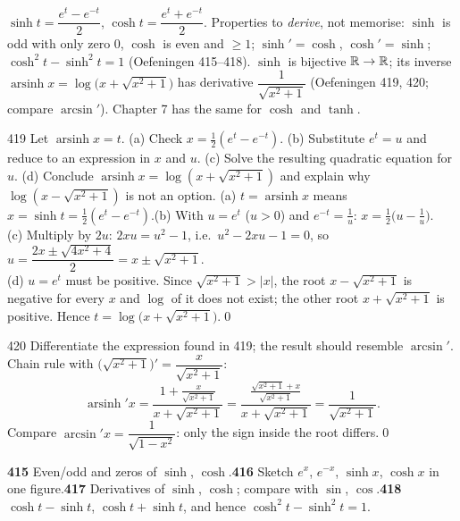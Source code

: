 \begin{key}[{\S4.4}]
$\sinh t=\dfrac{e^t-e^{-t}}2$, $\cosh t=\dfrac{e^t+e^{-t}}2$. Properties to \emph{derive}, not memorise: $\sinh$ is odd with only zero $0$, $\cosh$ is even and $\ge1$; $\sinh'=\cosh$, $\cosh'=\sinh$; $\cosh^2t-\sinh^2t=1$ (Oefeningen 415--418). $\sinh$ is bijective $\mathbb{R}\to\mathbb{R}$; its inverse $\operatorname{arsinh}x=\log\big(x+\sqrt{x^2+1}\big)$ has derivative $\dfrac1{\sqrt{x^2+1}}$ (Oefeningen 419, 420; compare $\arcsin'$). Chapter 7 has the same for $\cosh$ and $\tanh$.
\end{key}

\begin{bookex}{419}
Let $\operatorname{arsinh}x=t$. (a) Check $x=\frac12(e^t-e^{-t})$. (b) Substitute $e^t=u$ and reduce to an expression in $x$ and $u$. (c) Solve the resulting quadratic equation for $u$. (d) Conclude $\operatorname{arsinh}x=\log(x+\sqrt{x^2+1})$ and explain why $\log(x-\sqrt{x^2+1})$ is not an option.
\solution
(a) $t=\operatorname{arsinh}x$ means $x=\sinh t=\frac12(e^t-e^{-t})$.\quad (b) With $u=e^t$ ($u>0$) and $e^{-t}=\frac1u$: $x=\frac12\big(u-\frac1u\big)$.\\
(c) Multiply by $2u$: $2xu=u^2-1$, i.e.\ $u^2-2xu-1=0$, so $u=\dfrac{2x\pm\sqrt{4x^2+4}}2=x\pm\sqrt{x^2+1}$.\\
(d) $u=e^t$ must be positive. Since $\sqrt{x^2+1}>|x|$, the root $x-\sqrt{x^2+1}$ is negative for every $x$ and $\log$ of it does not exist; the other root $x+\sqrt{x^2+1}$ is positive. Hence $t=\log\big(x+\sqrt{x^2+1}\big)$.\qed
\end{bookex}

\begin{bookex}{420}
Differentiate the expression found in 419; the result should resemble $\arcsin'$.
\solution
Chain rule with $\big(\sqrt{x^2+1}\big)'=\dfrac{x}{\sqrt{x^2+1}}$:
\[
\operatorname{arsinh}'x=\frac{1+\frac{x}{\sqrt{x^2+1}}}{x+\sqrt{x^2+1}}=\frac{\frac{\sqrt{x^2+1}+x}{\sqrt{x^2+1}}}{x+\sqrt{x^2+1}}=\frac1{\sqrt{x^2+1}}.
\]
Compare $\arcsin'x=\dfrac1{\sqrt{1-x^2}}$: only the sign inside the root differs.\qed
\end{bookex}

\begin{trybox}[{415, 416, 417, 418}]
\textbf{415} Even/odd and zeros of $\sinh$, $\cosh$.\quad \textbf{416} Sketch $e^x$, $e^{-x}$, $\sinh x$, $\cosh x$ in one figure.\quad \textbf{417} Derivatives of $\sinh$, $\cosh$; compare with $\sin$, $\cos$.\quad \textbf{418} $\cosh t-\sinh t$, $\cosh t+\sinh t$, and hence $\cosh^2t-\sinh^2t=1$.
\end{trybox}

